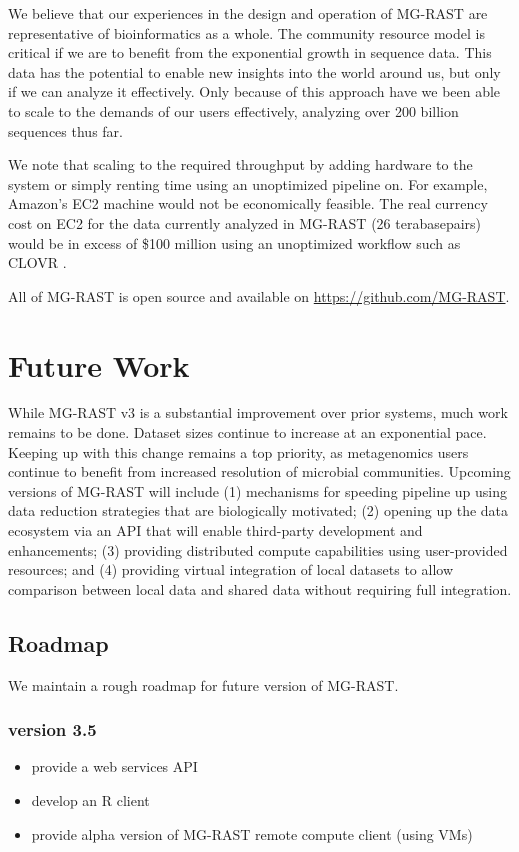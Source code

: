 \documentclass[12pt,fullpage]{report}
\begin{document}
We believe that our experiences in the design and operation of MG-RAST are representative of bioinformatics as a whole. The community resource model is critical if we are to benefit from the exponential growth in sequence data. This data has the potential to enable new insights into the world around us, but only if we can analyze it effectively. Only because of this approach have we been able to scale to the demands of our users effectively, analyzing over 200 billion sequences thus far.

We note that scaling to the required throughput by adding hardware to the system or simply renting time using an unoptimized pipeline on. For example,  Amazon’s EC2 machine would not be economically feasible. The real currency cost on EC2 for the data currently analyzed in MG-RAST (26 terabasepairs) would be in excess of \$100 million using an unoptimized workflow such as CLOVR \cite{CLOVR}.

All of MG-RAST is open source and available on \url{https://github.com/MG-RAST}.


\section{Future Work}

While MG-RAST v3 is a substantial improvement over prior systems, much work remains to be done. Dataset sizes continue to increase at an exponential pace. Keeping up with this change remains a top priority, as metagenomics users continue to benefit from increased resolution of microbial communities. Upcoming versions of MG-RAST will include (1) mechanisms for speeding pipeline up using data reduction strategies that are biologically motivated; (2) opening up the data ecosystem via an API that will enable third-party development and enhancements; (3) providing distributed compute capabilities using user-provided resources; and (4) providing virtual integration of local datasets to allow comparison between local data and shared data without requiring full integration.
\subsection{Roadmap}
We maintain a rough roadmap for future version of MG-RAST.

\subsubsection*{version 3.5}
\begin{itemize}
\item provide  a web services API
\item develop an R client
\item provide alpha version of MG-RAST remote compute client (using VMs)
\end{itemize}
\end{document}
